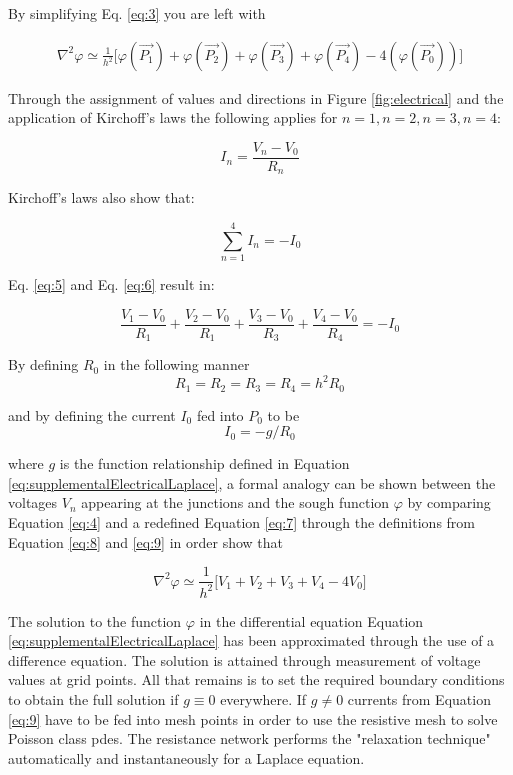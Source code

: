 By simplifying Eq. \ref{eq:3} you are left with

\begin{equation}\label{eq:4}
\begin{split}
  \nabla^2 \varphi \simeq 
  \frac{1}{h^2} \Big[ \varphi(\vec{P_1}) +  \varphi(\vec{P_2}) +  \varphi(\vec{P_3}) +  \varphi(\vec{P_4}) - 4( \varphi(\vec{P_0}) ) \Big]
\end{split}
\end{equation}


Through the assignment of values and directions in Figure \ref{fig:electrical} and the application of Kirchoff's laws the following applies for $n = 1,n=2,n = 3, n = 4$:

\begin{equation}\label{eq:5}
	I_n = \frac{V_n - V_0}{R_n}
\end{equation}

Kirchoff's laws also show that:

\begin{equation}\label{eq:6}
	\sum_{n=1}^{4} I_n = - I_0 
\end{equation}

Eq. \ref{eq:5} and Eq. \ref{eq:6} result in: 

\begin{equation}\label{eq:7}
	\frac{V_1 - V_0}{R_1} + \frac{V_2 - V_0}{R_1} + \frac{V_3 - V_0}{R_3} + \frac{V_4 - V_0}{R_4} = -I_0
\end{equation}

By defining $R_0$ in the following manner
\begin{equation}\label{eq:8}
	R_1 = R_2 = R_3 = R_4 = h^2R_0
\end{equation}

and by defining the current $I_0$ fed into $P_0$ to be
\begin{equation}\label{eq:9}
	I_0 = -g/R_0
\end{equation}

where $g$ is the function relationship defined in Equation \ref{eq:supplementalElectricalLaplace}, a formal analogy can be shown between the voltages $V_n$ appearing at the junctions and the sough function $\varphi$ by comparing Equation \ref{eq:4} and a redefined Equation \ref{eq:7} through the definitions from Equation \ref{eq:8} and \ref{eq:9} in order show that  

\begin{equation}\label{eq:10}
  \nabla^2 \varphi \simeq  \frac{1}{h^2} \Big[ V_1 + V_2 + V_3 + V_4 - 4V_0 \Big]
\end{equation}

The solution to the function $\varphi$ in the differential equation Equation \ref{eq:supplementalElectricalLaplace} has been approximated through the use of a difference equation. The solution is attained through measurement of voltage values at grid points. All that remains is to set the required boundary conditions to obtain the full solution if $g \equiv 0$ everywhere. If $g \neq 0$ currents from Equation \ref{eq:9} have to be fed into mesh points in order to use the resistive mesh to solve Poisson class \acrshort{pde}s. The resistance network performs the "relaxation technique" automatically and instantaneously for a Laplace equation.